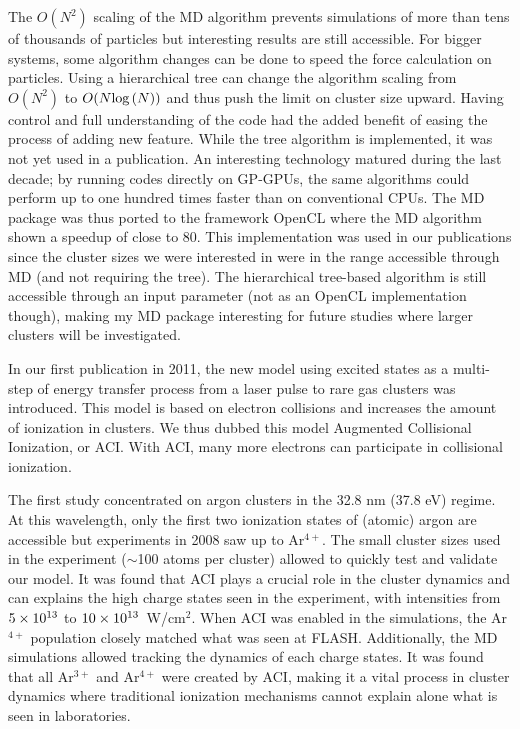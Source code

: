 The $O(N^2)$ scaling of the MD algorithm prevents simulations of more than tens
of thousands of particles but interesting results are still accessible.
For bigger systems, some algorithm changes can be done to speed the force
calculation on particles. Using a hierarchical tree can change the algorithm
scaling from $O(N^2)$ to $O(N \textrm{log}\left( N \right))$ and thus push the limit on
cluster size upward. Having control and full understanding of the code had
the added benefit of easing the process of adding new feature. While the tree
algorithm is implemented, it was not yet used in a publication. An interesting
technology matured during the last decade; by running codes directly on GP-GPUs,
the same algorithms could perform up to one hundred times faster than on
conventional CPUs. The MD package was thus ported to the framework OpenCL where
the MD algorithm shown a speedup of close to 80. This implementation was used
in our publications since the cluster sizes we were interested in were
in the range accessible through MD (and not requiring the tree). The
hierarchical tree-based algorithm is still accessible through an input parameter
(not as an OpenCL implementation though), making my MD package interesting for
future studies where larger clusters will be investigated.

In our first publication in 2011, the new model using excited states as a
multi-step of energy transfer process from a laser pulse to rare gas clusters
was introduced. This model is based on electron collisions and increases the
amount of ionization in clusters. We thus dubbed this model Augmented
Collisional Ionization, or ACI. With ACI, many more electrons can participate in
collisional ionization.

The first study concentrated on argon clusters in the 32.8 nm (37.8 eV) regime.
At this wavelength, only the first two ionization states of (atomic) argon are
accessible but experiments in 2008 saw up to Ar$^{4+}$. The small cluster sizes
used in the experiment ($\sim$100 atoms per cluster) allowed to quickly test and
validate our model. It was found that ACI plays a crucial role in the cluster
dynamics and can explains the high charge states seen in the experiment, with
intensities from $\ten{5}{13}$ to $\ten{10}{13}$~W/cm$^{2}$. When ACI was
enabled in the simulations, the Ar$^{4+}$ population closely matched what was
seen at FLASH. Additionally, the MD simulations allowed tracking the dynamics
of each charge states. It was found that all Ar$^{3+}$ and Ar$^{4+}$ were
created by ACI, making it a vital process in cluster dynamics where traditional
ionization mechanisms cannot explain alone what is seen in laboratories.

